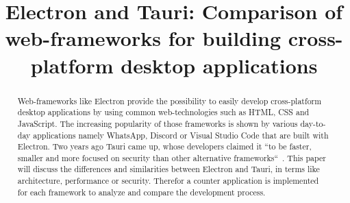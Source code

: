 \documentclass{acm_proc_article-sp}
\date{\displaydate{date}}
\begin{document}
    \title{{\ttlit Electron} and {\ttlit Tauri}: Comparison of web-frameworks for building cross-platform desktop applications}
    \author{
        \alignauthor
    }

    \maketitle

    \begin{abstract}
        Web-frameworks like Electron provide the possibility to easily develop cross-platform desktop applications by using common web-technologies
        such as \ac{HTML}, \ac{CSS} and JavaScript.
        The increasing popularity of those frameworks is shown by various day-to-day applications namely WhatsApp, Discord or Visual Studio Code
        that are built with Electron.
        Two years ago Tauri came up, whose developers claimed it ``to be faster, smaller and more focused on security than other alternative frameworks``~\cite{tauri}.
        This paper will discuss the differences and similarities between Electron and Tauri, in terms like architecture, performance or security.
        Therefor a counter application is implemented for each framework to analyze and compare the development process.
    \end{abstract}
    
    
    
    
    
    
    
    \newpage

    
    

    \balancecolumns
\end{document}
